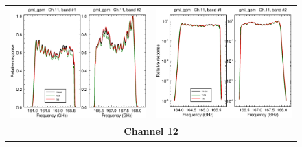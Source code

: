 \begin{figure}[H]
\begin{tabular}{c c}
    \includegraphics[scale=0.35]{graphics/lin/gmi_gpm-11.eps} &
    \includegraphics[scale=0.35]{graphics/log/gmi_gpm-11.eps} \\
    \multicolumn{2}{c}{\sffamily\textbf{Channel 12}}\\

\end{tabular}
\end{figure}
